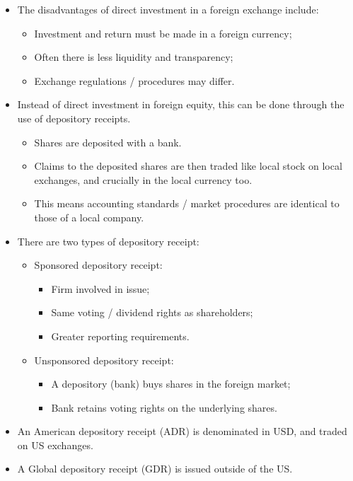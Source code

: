 \documentclass[../notes_compiled.tex]{subfiles}
\begin{document}
\begin{itemize}
\item The disadvantages of direct investment in a foreign exchange include:
\begin{itemize}
\item Investment and return must be made in a foreign currency;
\item Often there is less liquidity and transparency;
\item Exchange regulations / procedures may differ.
\end{itemize}

\item Instead of direct investment in foreign equity, this can be done through the use of depository receipts.
\begin{itemize}
\item Shares are deposited with a bank.
\item Claims to the deposited shares are then traded like local stock on local exchanges, and crucially in the local currency too.
\item This means accounting standards / market procedures are identical to those of a local company.

\end{itemize}

\item There are two types of depository receipt:
\begin{itemize}
\item Sponsored depository receipt:
\begin{itemize}
\item Firm involved in issue;
\item Same voting / dividend rights as shareholders;
\item Greater reporting requirements.
\end{itemize}
\item Unsponsored depository receipt:
\begin{itemize}
\item A depository (bank) buys shares in the foreign market;
\item Bank retains voting rights on the underlying shares.
\end{itemize}
\end{itemize}

\item An American depository receipt (ADR) is denominated in USD, and traded on US exchanges.
\item A Global depository receipt (GDR) is issued outside of the US.

\end{itemize}
\end{document}
